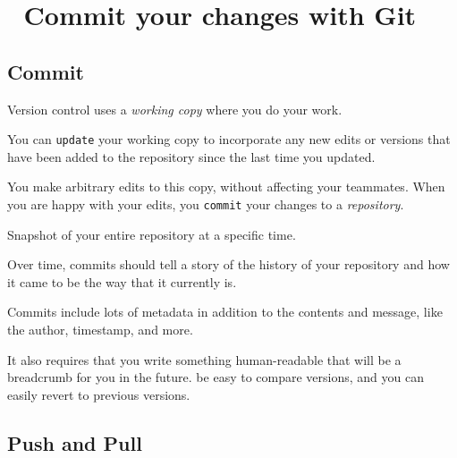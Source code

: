 \documentclass[
  letterpaper,
  DIV=11,
  numbers=noendperiod,
  oneside]{scrreprt}
\begin{document}
\hypertarget{commit-your-changes-with-git}{%
\chapter{\texorpdfstring{{📘} Commit your changes with
Git}{📘 Commit your changes with Git}}\label{commit-your-changes-with-git}}

\hypertarget{commit}{%
\section{Commit}\label{commit}}

Version control uses a \emph{working copy} where you do your work.

\begin{tcolorbox}[enhanced jigsaw, coltitle=black, opacityback=0, title=\textcolor{quarto-callout-note-color}{\faInfo}\hspace{0.5em}{Note}, toprule=.15mm, bottomtitle=1mm, colbacktitle=quarto-callout-note-color!10!white, colframe=quarto-callout-note-color-frame, left=2mm, opacitybacktitle=0.6, bottomrule=.15mm, arc=.35mm, toptitle=1mm, colback=white, titlerule=0mm, breakable, leftrule=.75mm, rightrule=.15mm]

You can \texttt{update} your working copy to incorporate any new edits
or versions that have been added to the repository since the last time
you updated.

\end{tcolorbox}

You make arbitrary edits to this copy, without affecting your teammates.
When you are happy with your edits, you \texttt{commit} your changes to
a \emph{repository}.

Snapshot of your entire repository at a specific time.

Over time, commits should tell a story of the history of your repository
and how it came to be the way that it currently is.

Commits include lots of metadata in addition to the contents and
message, like the author, timestamp, and more.

It also requires that you write something human-readable that will be a
breadcrumb for you in the future. be easy to compare versions, and you
can easily revert to previous versions.

\hypertarget{push-and-pull}{%
\section{Push and Pull}\label{push-and-pull}}
\end{document}

